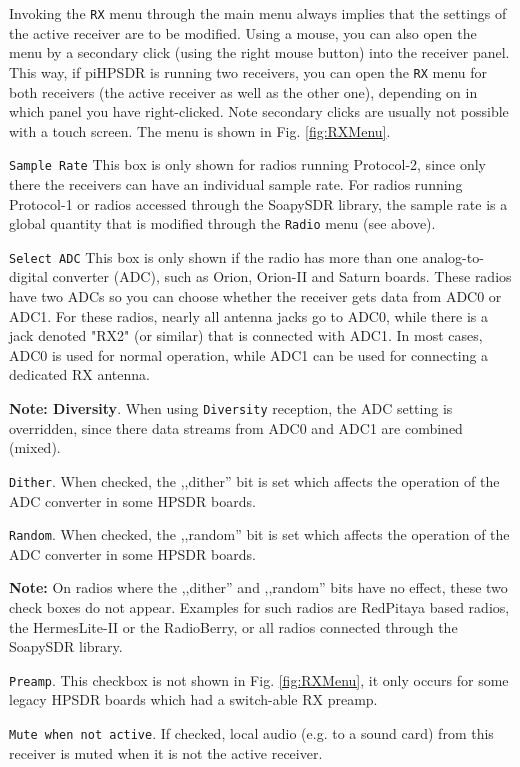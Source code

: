 \documentclass[12pt]{book}
\def\rett#1{\texttt{\color{red}#1}}
\def\bltt#1{\texttt{\color{blue}#1}}
\def\pH{pi\-HPSDR\xspace}
\begin{document}
Invoking the \bltt{RX} menu through the main menu always implies that the settings
of the active receiver are to be modified. Using a mouse, you can also open the menu
by a secondary click (using the right mouse button) into the receiver panel. This way,
if \pH is running two receivers, you can open the \bltt{RX} menu for both receivers
(the active receiver as well as the other one), depending on in which panel you have
right-clicked. Note secondary clicks are usually not possible with a touch screen.
The menu is shown in Fig. \ref{fig:RXMenu}.

\rett{Sample Rate} This box is only shown for radios running Protocol-2, since only there the
receivers can have an individual sample rate. For radios running Protocol-1 or radios accessed
through the SoapySDR library, the sample rate is a global quantity that is modified
through the \bltt{Radio} menu (see above).

\rett{Select ADC} This box is only shown if the radio has more than one analog-to-digital
converter (ADC), such as Orion, Orion-II and Saturn boards. These radios have two ADCs so
you can choose whether the receiver gets data from ADC0 or ADC1. For these radios, nearly
all antenna jacks go to ADC0, while there is a jack denoted "RX2" (or similar) that
is connected with ADC1. In most cases, ADC0 is used for normal operation, while ADC1
can be used for connecting a dedicated RX antenna.

\textbf{Note: Diversity}. When using \bltt{Diversity} reception, the ADC setting is
overridden, since there data streams from ADC0 and ADC1 are combined (mixed).

\rett{Dither}. When checked, the ,,dither'' bit is set which affects the operation of
the ADC converter in some HPSDR boards.

\rett{Random}. When checked, the ,,random'' bit is set which affects the operation of
the ADC converter in some HPSDR boards.

\textbf{Note:} On radios where the ,,dither'' and ,,random'' bits have no effect, these
two check boxes do not appear. Examples for such radios are RedPitaya based radios,
the HermesLite-II or the RadioBerry, or all radios connected through the SoapySDR
library.

\rett{Preamp}. This checkbox is not shown in Fig. \ref{fig:RXMenu}, it only occurs
for some legacy HPSDR boards which had a switch-able RX preamp.

\rett{Mute when not active}. If checked, local audio (e.g. to a sound card)
from this receiver is muted when
it is not the active receiver.
\end{document}
